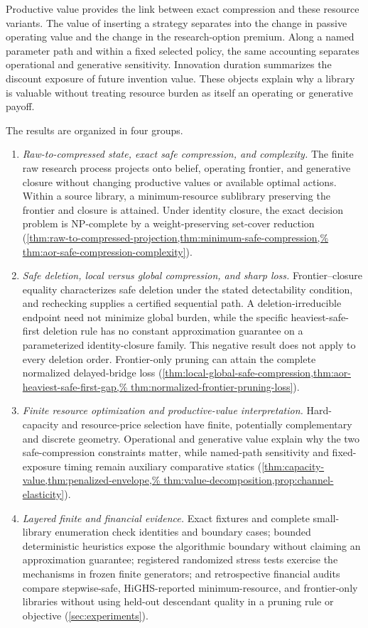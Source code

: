 Productive value provides the link between exact compression and these
resource variants. The value of inserting a strategy separates into the
change in passive operating value and the change in the research-option
premium. Along a named parameter path and within a fixed selected policy, the
same accounting separates operational and generative sensitivity. Innovation
duration summarizes the discount exposure of future invention value. These
objects explain why a library is valuable without treating resource burden as
itself an operating or generative payoff.

The results are organized in four groups.
\begin{enumerate}
\item \emph{Raw-to-compressed state, exact safe compression, and complexity.}
The finite raw research process projects onto belief, operating frontier, and
generative closure without changing productive values or available optimal
actions. Within a source library, a minimum-resource sublibrary preserving the
frontier and closure is attained. Under identity closure, the exact decision
problem is NP-complete by a weight-preserving set-cover reduction
(\cref{thm:raw-to-compressed-projection,thm:minimum-safe-compression,%
thm:aor-safe-compression-complexity}).

\item \emph{Safe deletion, local versus global compression, and sharp loss.}
Frontier--closure equality characterizes safe deletion under the stated
detectability condition, and rechecking supplies a certified sequential path.
A deletion-irreducible endpoint need not minimize global burden, while the
specific heaviest-safe-first deletion rule has no constant approximation
guarantee on a parameterized identity-closure family.  This negative result
does not apply to every deletion order.  Frontier-only pruning can attain the
complete normalized delayed-bridge loss
(\cref{thm:local-global-safe-compression,thm:aor-heaviest-safe-first-gap,%
thm:normalized-frontier-pruning-loss}).

\item \emph{Finite resource optimization and productive-value interpretation.}
Hard-capacity and resource-price selection have finite, potentially
complementary and discrete geometry. Operational and generative value explain
why the two safe-compression constraints matter, while named-path sensitivity
and fixed-exposure timing remain auxiliary comparative statics
(\cref{thm:capacity-value,thm:penalized-envelope,%
thm:value-decomposition,prop:channel-elasticity}).

\item \emph{Layered finite and financial evidence.}
Exact fixtures and complete small-library enumeration check identities and
boundary cases; bounded deterministic heuristics expose the algorithmic
boundary without claiming an approximation guarantee; registered randomized
stress tests exercise the mechanisms in frozen finite generators; and
retrospective financial audits compare stepwise-safe, HiGHS-reported
minimum-resource, and frontier-only libraries without using held-out
descendant quality in a pruning rule or objective
(\cref{sec:experiments}).
\end{enumerate}

